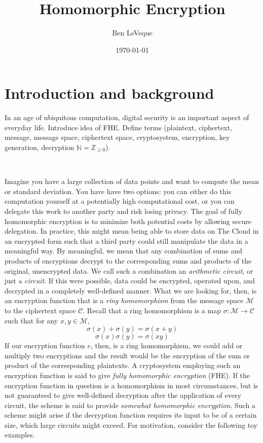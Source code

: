 \documentclass[11pt]{report}
\title{Homomorphic Encryption}
\author{Ben LeVeque}
\date{\today}
\newcommand{\Z}{\mathbb{Z}}
\newcommand{\N}{\mathbb{N}}
\newcommand{\M}{\mathcal{M}}
\begin{document}
\maketitle


\tableofcontents

\newpage

\section[Intro]{Introduction and background}

In an age of ubiquitous computation, digital security is an important aspect of everyday life. Introduce idea of FHE. Define terms (plaintext, ciphertext, message, message space, ciphertext space, cryptosystem, encryption, key generation, decryption $\N=\Z_{\geq 0}$).

\

Imagine you have a large collection of data points and want to compute the mean or standard deviation. You have have two options: you can either do this computation yourself at a potentially high computational cost, or you can delegate this work to another party and risk losing privacy.  The goal of fully homomorphic encryption is to minimize both potential costs by allowing secure delegation. In practice, this might mean being able to store data on The Cloud in an encrypted form such that a third party could still manipulate the data in a meaningful way. By meaningful, we mean that any combination of sums and products of encryptions decrypt to the corresponding sums and products of the original, unencrypted data. We call such a combination an \emph{arithmetic circuit}, or just a \emph{circuit}. If this were possible, data could be encrypted, operated upon, and decrypted in a completely well-defined manner. What we are looking for, then, is an encryption function that is a \emph{ring homomorphism} from the message space $\M$ to the ciphertext space $\mathcal{C}$. Recall that a ring homomorphism is a map $\sigma: \M \rightarrow \mathcal{C}$ such that for any $x,y\in \M$, \[\sigma(x)+\sigma(y) = \sigma(x+y)\] \[\sigma(x) \sigma(y) = \sigma(xy)\] If our encryption function $e$, then, is a ring homomorphism, we could add or multiply two encryptions and the result would be the encryption of the sum or product of the corresponding plaintexts. A cryptosystem employing such an encryption function is said to give \emph{fully homomorphic encryption} (FHE). If the encryption function in question is a homomorphism in most circumstances, but is not guaranteed to give well-defined decryption after the application of every circuit, the scheme is said to provide \emph{somewhat homomorphic encryption}. Such a scheme might arise if the decryption function requires its input to be of a certain size, which large circuits might exceed. For motivation, consider the following toy examples.
\end{document}
